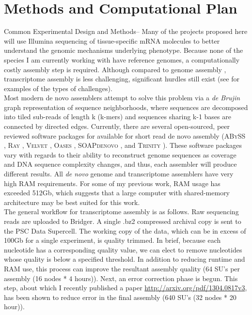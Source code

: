\documentclass[10.5pt]{article}
\begin{document}
{\section*{Methods and Computational Plan}

Common Experimental Design and Methods-- Many of the projects proposed here will use Illumina sequencing of tissue-specific mRNA molecules to better understand the genomic mechanisms underlying phenotype.  Because none of the species I am currently working with have reference genomes, a computationally costly assembly step is required. Although compared to genome assembly \citep{Bradnam:2013uu,Earl:2011gt}, transcriptome assembly is less challenging, significant hurdles still exist (see \cite{Francis:2013gc,Vijay:2012gy,Pyrkosz:2013tm} for examples of the types of challenges). \\

\noindent
Most modern de novo assemblers attempt to solve this problem via a \textit{de Brujin} graph representation of sequence neighborhoods, where sequences are decomposed into tiled sub-reads of length k (k-mers) and sequences sharing k-1 bases are connected by directed edges.  Currently, there are several open-sourced, peer reviewed software packages for available for short read de novo assembly (\textsc{ABySS} \citep{Birol:2009ia,Simpson:2009iv}, \textsc{Ray} \citep{Boisvert:2010dz}, \textsc{Velvet} \citep{Zerbino:2008bm}, \textsc{Oases} \citep{Schulz:2012je}, \textsc{SOAPdenovo} \citep{Li:2009cx},  and \textsc{Trinity} \citep{Haas:jq,Grabherr:2011jb}).  These software packages vary with regards to their ability to reconstruct genome sequences as coverage and DNA sequence complexity changes, and thus, each assembler will produce different results.  All \textit{de novo} genome and transcriptome assemblers have very high RAM requirements. For some of my previous work, RAM usage has exceeded 512Gb, which suggests that a large computer with shared-memory architecture may be best suited for this work.   \\

\noindent
The general workflow for transcriptome assembly is as follows. Raw sequencing reads are uploaded to Bridger.  A single .bz2 compressed archival copy is sent to the PSC Data Supercell. The working copy of the data, which can be in excess of 100Gb for a single experiment, is quality trimmed. In brief, because each nucleotide has a corresponding quality value, we can elect to remove nucleotides whose quality is below a specified threshold. In addition to reducing runtime and RAM use, this process can improve the resultant assembly quality (64 SU's per assembly (16 nodes * 4 hours)). Next, an error correction phase is begun.  This step, about which I recently published a paper \url{http://arxiv.org/pdf/1304.0817v3}, has been shown to reduce error in the final assembly (640 SU's (32 nodes * 20 hour)).  \\

}
\end{document}
